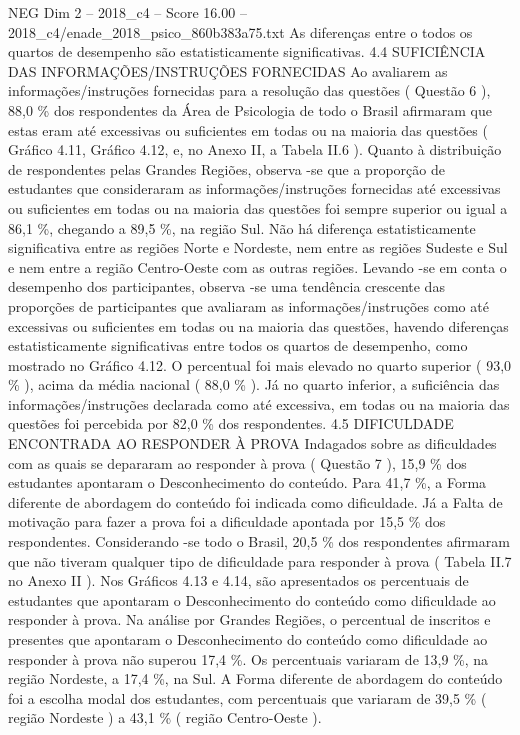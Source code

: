 \begin{textsample}{NEG Dim 2 – 2018\_c4 – Score 16.00 – 2018\_c4/enade\_2018\_psico\_860b383a75.txt}
As diferenças entre o todos os quartos de desempenho são estatisticamente significativas. 4.4 SUFICIÊNCIA DAS INFORMAÇÕES/INSTRUÇÕES FORNECIDAS Ao avaliarem as informações/instruções fornecidas para a resolução das questões ( Questão 6 ), 88,0 \% dos respondentes da Área de Psicologia de todo o Brasil afirmaram que estas eram até excessivas ou suficientes em todas ou na maioria das questões ( Gráfico 4.11, Gráfico 4.12, e, no Anexo II, a Tabela II.6 ).
Quanto à distribuição de respondentes pelas Grandes Regiões, observa -se que a proporção de estudantes que consideraram as informações/instruções fornecidas até excessivas ou suficientes em todas ou na maioria das questões foi sempre superior ou igual a 86,1 \%, chegando a 89,5 \%, na região Sul.
Não há diferença estatisticamente significativa entre as regiões Norte e Nordeste, nem entre as regiões Sudeste e Sul e nem entre a região Centro-Oeste com as outras regiões.
Levando -se em conta o desempenho dos participantes, observa -se uma tendência crescente das proporções de participantes que avaliaram as informações/instruções como até excessivas ou suficientes em todas ou na maioria das questões, havendo diferenças estatisticamente significativas entre todos os quartos de desempenho, como mostrado no Gráfico 4.12.
O percentual foi mais elevado no quarto superior ( 93,0 \% ), acima da média nacional ( 88,0 \% ).
Já no quarto inferior, a suficiência das informações/instruções declarada como até excessiva, em todas ou na maioria das questões foi percebida por 82,0 \% dos respondentes. 4.5 DIFICULDADE ENCONTRADA AO RESPONDER À PROVA Indagados sobre as dificuldades com as quais se depararam ao responder à prova ( Questão 7 ), 15,9 \% dos estudantes apontaram o Desconhecimento do conteúdo.
Para 41,7 \%, a Forma diferente de abordagem do conteúdo foi indicada como dificuldade.
Já a Falta de motivação para fazer a prova foi a dificuldade apontada por 15,5 \% dos respondentes.
Considerando -se todo o Brasil, 20,5 \% dos respondentes afirmaram que não tiveram qualquer tipo de dificuldade para responder à prova ( Tabela II.7 no Anexo II ).
Nos Gráficos 4.13 e 4.14, são apresentados os percentuais de estudantes que apontaram o Desconhecimento do conteúdo como dificuldade ao responder à prova.
Na análise por Grandes Regiões, o percentual de inscritos e presentes que apontaram o Desconhecimento do conteúdo como dificuldade ao responder à prova não superou 17,4 \%.
Os percentuais variaram de 13,9 \%, na região Nordeste, a 17,4 \%, na Sul.
A Forma diferente de abordagem do conteúdo foi a escolha modal dos estudantes, com percentuais que variaram de 39,5 \% ( região Nordeste ) a 43,1 \% ( região Centro-Oeste ).

\end{textsample}
